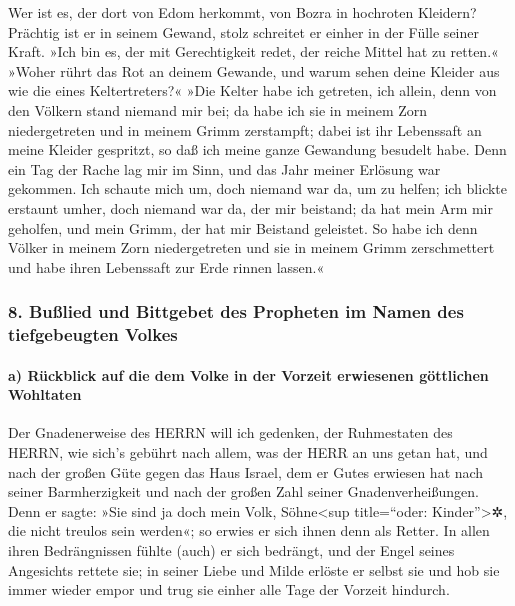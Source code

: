 Wer ist es, der dort von Edom herkommt, von Bozra in
hochroten Kleidern? Prächtig ist er in seinem Gewand, stolz schreitet er
einher in der Fülle seiner Kraft. »Ich bin es, der mit Gerechtigkeit
redet, der reiche Mittel hat zu retten.« »Woher rührt das
Rot an deinem Gewande, und warum sehen deine Kleider aus wie die eines
Keltertreters?« »Die Kelter habe ich getreten, ich allein,
denn von den Völkern stand niemand mir bei; da habe ich sie in meinem
Zorn niedergetreten und in meinem Grimm zerstampft; dabei ist ihr
Lebenssaft an meine Kleider gespritzt, so daß ich meine ganze Gewandung
besudelt habe. Denn ein Tag der Rache lag mir im Sinn, und
das Jahr meiner Erlösung war gekommen. Ich schaute mich
um, doch niemand war da, um zu helfen; ich blickte erstaunt umher, doch
niemand war da, der mir beistand; da hat mein Arm mir geholfen, und mein
Grimm, der hat mir Beistand geleistet. So habe ich denn
Völker in meinem Zorn niedergetreten und sie in meinem Grimm
zerschmettert und habe ihren Lebenssaft zur Erde rinnen lassen.«

\hypertarget{buuxdflied-und-bittgebet-des-propheten-im-namen-des-tiefgebeugten-volkes}{%
\subsubsection{8. Bußlied und Bittgebet des Propheten im Namen des
tiefgebeugten
Volkes}\label{buuxdflied-und-bittgebet-des-propheten-im-namen-des-tiefgebeugten-volkes}}

\hypertarget{a-ruxfcckblick-auf-die-dem-volke-in-der-vorzeit-erwiesenen-guxf6ttlichen-wohltaten}{%
\paragraph{a) Rückblick auf die dem Volke in der Vorzeit erwiesenen
göttlichen
Wohltaten}\label{a-ruxfcckblick-auf-die-dem-volke-in-der-vorzeit-erwiesenen-guxf6ttlichen-wohltaten}}

Der Gnadenerweise des HERRN will ich gedenken, der
Ruhmestaten des HERRN, wie sich's gebührt nach allem, was der HERR an
uns getan hat, und nach der großen Güte gegen das Haus Israel, dem er
Gutes erwiesen hat nach seiner Barmherzigkeit und nach der großen Zahl
seiner Gnadenverheißungen. Denn er sagte: »Sie sind ja
doch mein Volk, Söhne\textless sup title=``oder: Kinder''\textgreater✲,
die nicht treulos sein werden«; so erwies er sich ihnen denn als Retter.
In allen ihren Bedrängnissen fühlte (auch) er sich
bedrängt, und der Engel seines Angesichts rettete sie; in seiner Liebe
und Milde erlöste er selbst sie und hob sie immer wieder empor und trug
sie einher alle Tage der Vorzeit hindurch.

